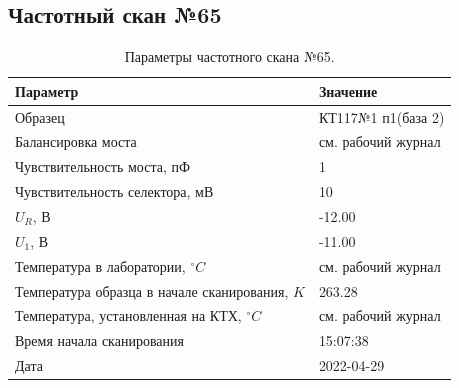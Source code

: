 \subsection{Частотный скан №65}
\begin{table}[!ht]
    \centering
    \caption{Параметры частотного скана №65.}
    \begin{tabular}{|l|l|}
        \hline
        Параметр                                       & Значение                  \\ \hline
        Образец                                        & КТ117№1 п1(база 2)        \\ \hline
        Балансировка моста                             & см. рабочий журнал        \\ \hline
        Чувствительность моста, пФ                     & 1                         \\ \hline
        Чувствительность селектора, мВ                 & 10                        \\ \hline
        $U_R$, В                                       & -12.00                    \\ \hline
        $U_1$, В                                       & -11.00                    \\ \hline
        Температура в лаборатории, $^\circ C$          & см. рабочий журнал        \\ \hline
        Температура образца в начале сканирования, $K$ & 263.28                    \\ \hline
        Температура, установленная на КТХ, $^\circ C$  & см. рабочий журнал        \\ \hline
        Время начала сканирования                      & 15:07:38                  \\ \hline
        Дата                                           & 2022-04-29                \\ \hline
    \end{tabular}
    \label{table:frequency_scan_65}
\end{table}

